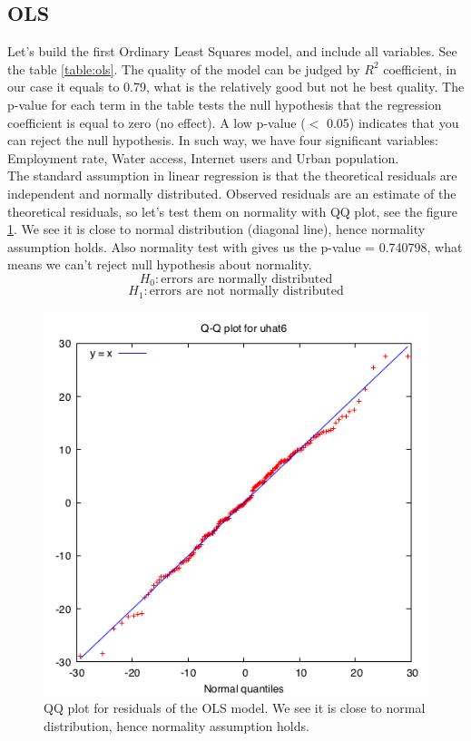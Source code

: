 \documentclass{article}
\begin{document}
\subsection{OLS}
Let's build the first Ordinary Least Squares model, and include all variables. See the table \ref{table:ols}. The quality of the model can be judged by $R^2$ coefficient, in our case it equals to 0.79, what is the relatively good but not he best quality. The p-value for each term in the table tests the null hypothesis that the regression coefficient is equal to zero (no effect). A low p-value ($<$ 0.05) indicates that you can reject the null hypothesis. In such way, we have four significant variables: Employment rate, Water access, Internet users and Urban population. \\

The standard assumption in linear regression is that the theoretical residuals are independent and normally distributed. Observed residuals are an estimate of the theoretical residuals, so let's test them on normality with QQ plot, see the figure \ref{fig:resid_qq}.  We see it is close to normal distribution (diagonal line), hence normality assumption holds. Also normality test with gives us the p-value = 0.740798, what means we can't reject null hypothesis about normality.\\

$$H_0: \text{errors are normally distributed}$$
$$H_1: \text{errors are not normally distributed}$$

\begin{figure}[H]
\begin{center}
\includegraphics[width=.5\textwidth]{resid_qq}
\caption{QQ plot for residuals of the OLS model. We see it is close to normal distribution, hence normality assumption holds.}
\label{fig:resid_qq}
\end{center}
\end{figure}
\end{document}
